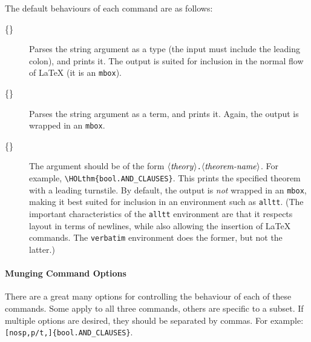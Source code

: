The default behaviours of each command are as follows:
\begin{description}
\item[\holty\{\textit{}\}]
%
%
Parses the string argument as a type (the input must include the leading colon), and prints it.
%
The output is suited for inclusion in the normal flow of \LaTeX{} (it is an \texttt{\bs{}mbox}).
\item[\holtm\{\textit{}\}]
%
%
Parses the string argument as a term, and prints it.
%
Again, the output is wrapped in an \texttt{\bs{}mbox}.
\item[\holthm\{\textit{}\}]
%
%
The argument should be of the form $\langle\mbox{\textit{theory}}\rangle\texttt{.}\langle{\mbox{\textit{theorem-name}}}\rangle$.
%
For example, \verb|\HOLthm{bool.AND_CLAUSES}|.
%
This prints the specified theorem with a leading turnstile.
%
By default, the output is \emph{not} wrapped in an \texttt{\bs{}mbox}, making it best suited for inclusion in an environment such as \texttt{alltt}.
%
(The important characteristics of the \texttt{alltt} environment are that it respects layout in terms of newlines, while also allowing the insertion of \LaTeX{} commands.  The \texttt{verbatim} environment does the former, but not the latter.)
\end{description}

\paragraph{Munging Command Options}
There are a great many options for controlling the behaviour of each of these commands.
%
Some apply to all three commands, others are specific to a subset.
%
\newcommand{\indentoption}{\gt\gt}
If multiple options are desired, they should be separated by commas. For example: \texttt{\holthm{}[nosp,p/t,\indentoption]\{bool.AND\_CLAUSES\}}.

